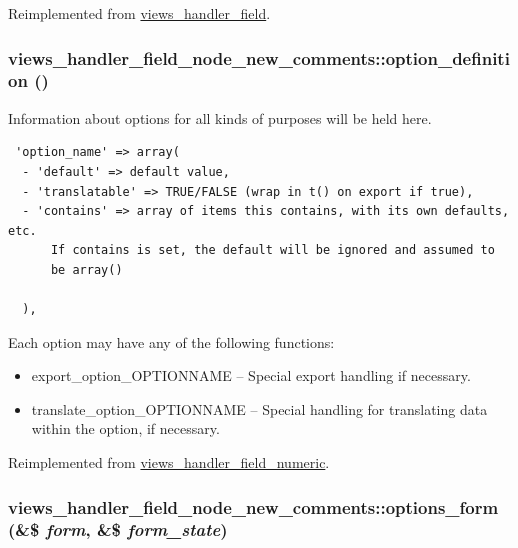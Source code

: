 Reimplemented from \hyperlink{classviews__handler__field_7eaaf0fd6fbc57c2955f88b257394d19}{views\_\-handler\_\-field}.\hypertarget{classviews__handler__field__node__new__comments_eea2f5790d310ddcaba82c05593e82e7}{
\subsubsection[{option\_\-definition}]{\setlength{\rightskip}{0pt plus 5cm}views\_\-handler\_\-field\_\-node\_\-new\_\-comments::option\_\-definition ()}}
\label{classviews__handler__field__node__new__comments_eea2f5790d310ddcaba82c05593e82e7}


Information about options for all kinds of purposes will be held here. 

\begin{Code}\begin{verbatim} 'option_name' => array(
  - 'default' => default value,
  - 'translatable' => TRUE/FALSE (wrap in t() on export if true),
  - 'contains' => array of items this contains, with its own defaults, etc.
      If contains is set, the default will be ignored and assumed to
      be array()

  ),
\end{verbatim}
\end{Code}

 Each option may have any of the following functions:\begin{itemize}
\item export\_\-option\_\-OPTIONNAME -- Special export handling if necessary.\item translate\_\-option\_\-OPTIONNAME -- Special handling for translating data within the option, if necessary. \end{itemize}


Reimplemented from \hyperlink{classviews__handler__field__numeric_ab74a55c8b3c564ee995e210a503947b}{views\_\-handler\_\-field\_\-numeric}.\hypertarget{classviews__handler__field__node__new__comments_2a209d3acbaa47e781df96bc0ca85156}{
\subsubsection[{options\_\-form}]{\setlength{\rightskip}{0pt plus 5cm}views\_\-handler\_\-field\_\-node\_\-new\_\-comments::options\_\-form (\&\$ {\em form}, \/  \&\$ {\em form\_\-state})}}
\label{classviews__handler__field__node__new__comments_2a209d3acbaa47e781df96bc0ca85156}


